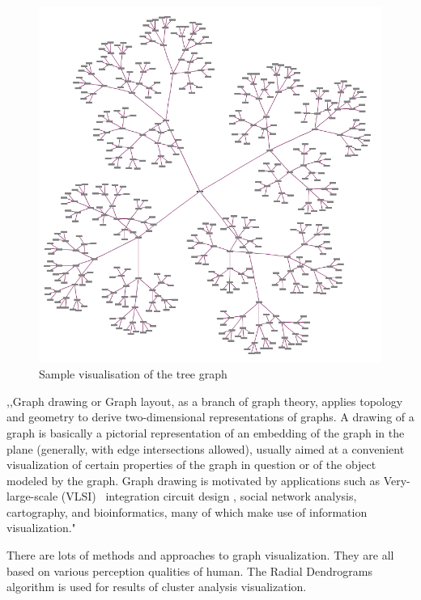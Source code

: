 \begin{figure}[h!]
\centering
\includegraphics[scale=0.3]{pictures/Tree_graph_example.png}
\caption{Sample visualisation of the tree graph}
\label{fig:tree_graph_example}
\end{figure}

,,Graph drawing or Graph layout, as a branch of graph theory, applies topology and geometry to derive two-dimensional representations of graphs. A drawing of a graph is basically a pictorial representation of an embedding of the graph in the plane (generally, with edge intersections allowed), usually aimed at a convenient visualization of certain properties of the graph in question or of the object modeled by the graph. Graph drawing is motivated by applications such as Very-large-scale (VLSI)~\cite{VLSI} integration circuit design , social network analysis, cartography, and bioinformatics, many of which make use of information visualization."~\cite{Graph_drawing}

There are lots of methods and approaches to graph visualization. They are all based on various perception qualities of human. The Radial Dendrograms~\cite{Radial_dendrogram} algorithm is used for results of cluster analysis visualization.


